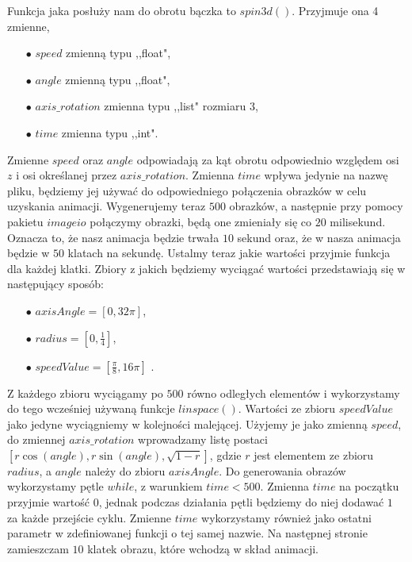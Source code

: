 \documentclass[a4paper,twoside,11pt,reqno]{mwrep}
\theoremstyle{plain} \newtheorem{twr}{Twierdzenie}
\theoremstyle{plain} \newtheorem{lem}{Lemat}
\theoremstyle{definition} \newtheorem{defi}{Definicja}
\theoremstyle{remark} \newtheorem*{wni}{Wniosek}
\theoremstyle{definition} \newtheorem{uwaga}{Uwaga}
\theoremstyle{definition}\newtheorem{prz}{Przykład}
\begin{document}
Funkcja jaka posłuży nam do obrotu bączka to $spin3d()$. Przyjmuje ona 4 zmienne,
\begin{itemize}
\item[$\bullet$] $speed$ zmienną typu ,,float",
\item[$\bullet$] $angle$ zmienną typu ,,float",
\item[$\bullet$] $axis\_rotation$ zmienna typu ,,list" rozmiaru $3$,
\item[$\bullet$] $time$ zmienna typu ,,int".
\end{itemize}
Zmienne $speed$ oraz $angle$ odpowiadają za kąt obrotu odpowiednio względem osi $z$ i osi określanej przez $axis\_rotation$. Zmienna $time$ wpływa jedynie na nazwę pliku, będziemy jej używać do odpowiedniego 
połączenia obrazków w celu uzyskania animacji. Wygenerujemy teraz $500$ obrazków, a następnie przy pomocy
pakietu $imageio$ połączymy obrazki, będą one zmieniały się co $20$ milisekund. Oznacza to, że nasz animacja
będzie trwała $10$ sekund oraz, że w nasza animacja będzie w $50$ klatach na sekundę.
Ustalmy teraz jakie wartości przyjmie funkcja dla każdej klatki.
Zbiory z jakich będziemy wyciągać wartości przedstawiają się w następujący sposób:
\begin{itemize}
\item[$\bullet$] $axisAngle = [0,32\pi]$,
\item[$\bullet$] $radius = \left[0,\frac{1}{4}\right]$,
\item[$\bullet$] $speedValue = [\frac{\pi}{8},16\pi]  $ .
\end{itemize}
Z każdego zbioru wyciągamy po $500$ równo odległych elementów i wykorzystamy do tego wcześniej używaną funkcje 
$linspace()$. Wartości ze zbioru $speedValue$ jako jedyne wyciągniemy w kolejności malejącej.
Użyjemy je jako zmienną $speed$, do zmiennej 
$axis\_rotation$ wprowadzamy listę postaci 
$[r\cos(angle),r\sin(angle),\sqrt{1-r}]$, gdzie $r$ jest elementem ze zbioru $radius$, a $angle$ należy do
zbioru $axisAngle$. Do generowania obrazów wykorzystamy pętle $while$, z warunkiem $time < 500$.
Zmienna $time$ na początku przyjmie wartość $0$, jednak podczas działania pętli będziemy do niej dodawać $1$
za każde przejście cyklu. Zmienne $time$ wykorzystamy również jako ostatni parametr w zdefiniowanej funkcji o
tej samej nazwie.
Na następnej stronie zamieszczam $10$ klatek obrazu, które wchodzą w skład animacji.
\end{document}
